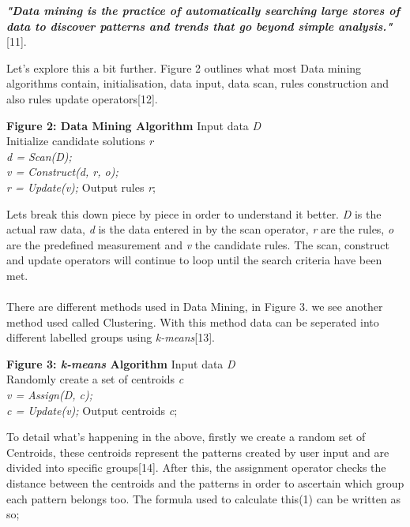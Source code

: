 \documentclass[10pt,journal,compsoc]{IEEEtran}
\begin{document}
\textbf{\textit{"Data mining is the practice of automatically searching large stores of data to discover patterns and trends that go beyond simple analysis."}}[11]. 

Let's explore this a bit further. Figure 2 outlines what most Data mining algorithms contain, initialisation, data input, data scan, rules construction and also rules update operators[12].\\



\begin{algoBox}{\textbf{Figure 2: Data Mining Algorithm}}
	{Input data \textit{D}}\\
	{Initialize candidate solutions \textit{r}}\\
	{
		\textit{d = Scan(D);\\
			v = Construct(d, r, o);\\
			r = Update(v);}
	}
	Output rules \textit{r};
\end{algoBox}

Lets break this down piece by piece in order to understand it better. \textit{D} is the actual raw data, \textit{d} is the data entered in by the scan operator, \textit{r} are the rules, \textit{o} are the predefined measurement and \textit{v} the candidate rules. The scan, construct and update operators will continue to loop until the search criteria have been met.\\\\
There are different methods used in Data Mining, in Figure 3\textsl{}. we see another method used called Clustering. With this method data can be seperated into different labelled groups using \textit{k-means}[13].\\


\begin{algoBox}{\textbf{Figure 3: \textit{k-means} Algorithm}}
	{Input data \textit{D}}\\
	{Randomly create a set of centroids \textit{c}}\\
	{
		\textit{v = Assign(D, c);\\
			c = Update(v);}
	}
	Output centroids \textit{c};
\end{algoBox}

To detail what's happening in the above, firstly we create a random set of Centroids, these centroids represent the patterns created by user input and are divided into specific groups[14]. After this, the assignment operator checks the distance between the centroids and the patterns in order to ascertain which group each pattern belongs too. The formula used to calculate this(1) can be written as so;
\end{document}
